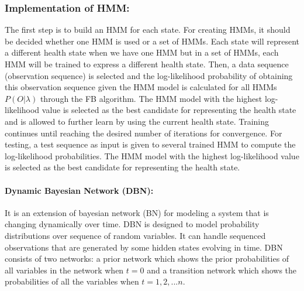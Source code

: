 \subsubsection*{Implementation of HMM:}
The first step is to build an HMM for each state. For creating HMMs, it should be decided whether one HMM is used or a set of HMMs. Each state will represent a different health state when we have one HMM but in a set of HMMs, each HMM will be trained to express a different health state.
Then, a data sequence (observation sequence) is selected and the log-likelihood probability of obtaining this observation sequence given the HMM model is calculated for all HMMs $P(O|\lambda )$ through the FB algorithm. The HMM model with the highest log-likelihood value is selected as the best candidate for representing the health state and is allowed to further learn by using the current health state. Training continues until reaching the desired number of iterations for convergence. For testing, a test sequence as input is given to several trained HMM to compute the log-likelihood probabilities. The HMM model with the highest log-likelihood value is selected as the best candidate for representing the health state.
\paragraph{Dynamic Bayesian Network (DBN):}
It is an extension of bayesian network (BN) for modeling a system that is changing dynamically over time. DBN \cite{camci2005dynamic, DBLP:journals/tase/CamciC10} is designed to model probability distributions over sequence of random variables. It can handle sequenced observations that are generated by some hidden states evolving in time. DBN consists of two networks: a prior network which shows the prior probabilities of all variables in the network when $t = 0$ and a transition network which shows the probabilities of all the variables when $t = 1,2,...n$.
